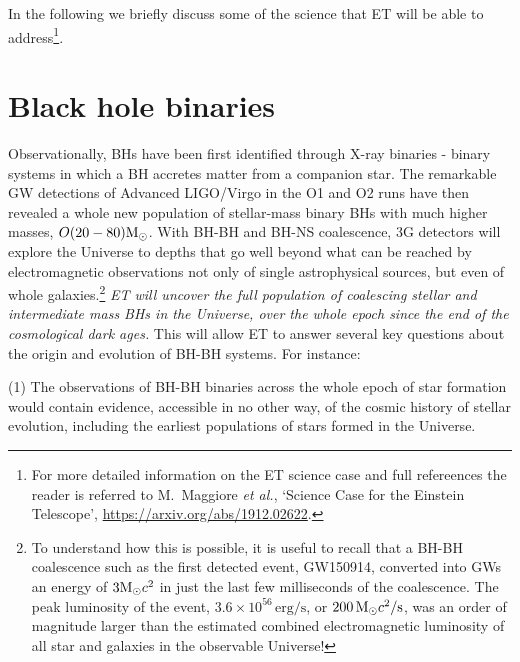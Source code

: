 In the following we briefly discuss some of the science that ET will be able to address\footnote{For more
detailed information on the ET science case and full refereences
the reader is referred to M.~Maggiore \textit{et al.}, `Science Case for the Einstein Telescope', \url{https://arxiv.org/abs/1912.02622}.}.



\section{Black hole binaries}\label{sect:Blackholebinaries}

Observationally, BHs have been first identified through X-ray binaries - binary systems in which a BH accretes matter from a companion star. The remarkable GW detections of Advanced LIGO/Virgo in the O1 and O2 runs have then revealed a whole new population of stellar-mass binary BHs with much higher masses, $O(20-80) \mathrm{M}_{\odot}$.
With BH-BH and BH-NS coalescence, 3G detectors will explore the Universe to
depths that go well beyond  what can be reached by electromagnetic observations
not only of single astrophysical sources, but even of whole
galaxies.\footnote{To understand how this is possible, it is useful to recall
that a BH-BH coalescence such as the first  detected event, GW150914, converted
into GWs an energy of  $3 \mathrm{M}_{\odot} c^2$  in just the last few milliseconds of the
coalescence. The peak luminosity of the event,  $3.6\times 10^{56}\, \mathrm{
erg/s}$, or  $200\, \mathrm{M}_{\odot} c^2/{\mathrm{s}}$, was an order of magnitude  larger than
the estimated combined electromagnetic luminosity of all star and galaxies in
the observable Universe!} \emph{ET will uncover the  full population of
coalescing stellar and intermediate mass BHs in the Universe, over the whole
epoch since the end of the cosmological dark ages.}
This will allow ET to answer several key questions about the origin and evolution of BH-BH systems. For instance:

(1) The  observations of BH-BH binaries  across the whole epoch of star formation would contain evidence,  accessible in no other way, of the cosmic history of stellar evolution, including the earliest populations of stars formed in the Universe.   

